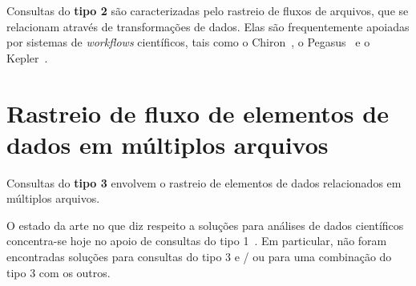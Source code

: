 Consultas do \textbf{tipo 2} são caracterizadas pelo rastreio de fluxos de arquivos, que se relacionam através de transformações de dados. Elas são frequentemente apoiadas por sistemas de \textit{workflows} científicos, tais como o Chiron~\cite{ogasawara2011algebraic}, o Pegasus~\cite{deelman2005pegasus} e o Kepler~\cite{ludascher2006scientific}.


\section{Rastreio de fluxo de elementos de dados em múltiplos arquivos}%
\label{sec:rastreio-de-elemento-de-dados-em-multiplos-arquivos}

Consultas do \textbf{tipo 3} envolvem o rastreio de elementos de dados relacionados em múltiplos arquivos.


O estado da arte no que diz respeito a soluções para análises de dados científicos concentra-se hoje no apoio de consultas do tipo 1~\cite{alagiannis2012nodb,karpathiotakis2014adaptive,silva2015propostadoutorado}. Em particular, não foram encontradas soluções para consultas do tipo 3 e / ou para uma combinação do tipo 3 com os outros.

